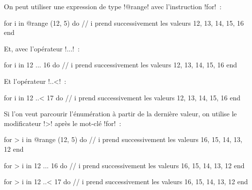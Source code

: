 On peut utiliser une expression de type \ggsq!@range! avec l'instruction \ggsq!for!~:

\begin{galgas34}
for i in @range (12, 5) do
  // i prend successivement les valeurs 12, 13, 14, 15, 16
end
\end{galgas34}

Et, avec l'opérateur \ggsq!...!~:
\begin{galgas34}
for i in 12 ... 16 do
  // i prend successivement les valeurs 12, 13, 14, 15, 16
end
\end{galgas34}

Et l'opérateur \ggsq!..<!~:
\begin{galgas34}
for i in 12 ..< 17 do
  // i prend successivement les valeurs 12, 13, 14, 15, 16
end
\end{galgas34}

Si l'on veut parcourir l'énumération à partir de la dernière valeur, on utilise le modificateur \ggsq!>! après le mot-clé \ggsq!for!~:
\begin{galgas34}
for > i in @range (12, 5) do
  // i prend successivement les valeurs 16, 15, 14, 13, 12
end
\end{galgas34}

\begin{galgas34}
for > i in 12 ... 16 do
  // i prend successivement les valeurs 16, 15, 14, 13, 12
end
\end{galgas34}

\begin{galgas34}
for > i in 12 ..< 17 do
  // i prend successivement les valeurs 16, 15, 14, 13, 12
end
\end{galgas34}


